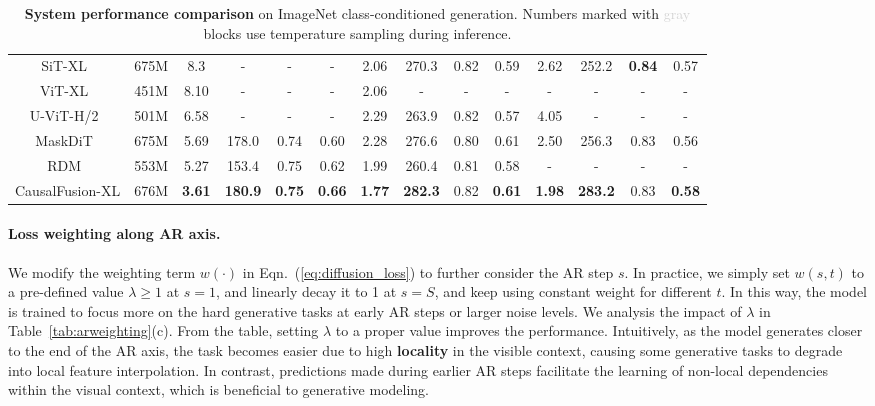 \begin{table}[t]
\begin{tabular}{c|c|cccc|cccc|cccc}
SiT-XL~\cite{sit} & 675M & 8.3 & - & - & - & 2.06 & 270.3 & 0.82 & 0.59 & 2.62 & 252.2 & \textbf{0.84} & 0.57 \\
ViT-XL~\cite{minsnr} & 451M & 8.10 & - & - & -  & 2.06 & - & - & - & - & - & - & - \\
U-ViT-H/2~\cite{bao2023all} & 501M & 6.58 & - & - & - & 2.29 & 263.9 & 0.82 & 0.57 & 4.05 & - & - & -\\
MaskDiT~\cite{zheng2023fast} & 675M & 5.69 & 178.0 & 0.74 & 0.60 & 2.28 & 276.6 & 0.80 & 0.61 & 2.50 & 256.3 & 0.83 & 0.56 \\
RDM~\cite{teng2023relay} & 553M & 5.27 & 153.4 & 0.75 & 0.62 & 1.99 & 260.4 & 0.81 & 0.58 & - & - & - & - \\
CausalFusion-XL & 676M & \textbf{3.61} & \textbf{180.9} & \textbf{0.75} & \textbf{0.66} & \textbf{1.77} & \textbf{282.3} & 0.82 & \textbf{0.61} & \textbf{1.98} & \textbf{283.2} & 0.83 & \textbf{0.58} \\
\end{tabular}
\vspace{-8pt}
\caption{
\textbf{System performance comparison} on ImageNet class-conditioned generation. Numbers marked with \textcolor{lightgray}{gray} blocks use temperature sampling during inference.
\vspace{-8pt}
}
\label{tab:system}
\end{table}

\vspace{-5pt}
\paragraph{Loss weighting along AR axis.} We modify the weighting term $w(\cdot)$ in Eqn.~(\ref{eq:diffusion_loss}) to further consider the AR step $s$. In practice, we simply set $w(s, t)$ to a pre-defined value $\lambda \geq 1$ at $s=1$, and linearly decay it to 1 at $s=S$, and keep using constant weight for different $t$. In this way, the model is trained to focus more on the hard generative tasks at early AR steps or larger noise levels.
We analysis the impact of $\lambda$ in Table~\ref{tab:arweighting}(c). From the table, setting $\lambda$ to a proper value improves the performance. Intuitively, as the model generates closer to the end of the AR axis, the task becomes easier due to high \textbf{locality}\cite{wang2018non} in the visible context, causing some generative tasks to degrade into local feature interpolation. 
In contrast, predictions made during earlier AR steps facilitate the learning of non-local dependencies within the visual context, which is beneficial to generative modeling.

